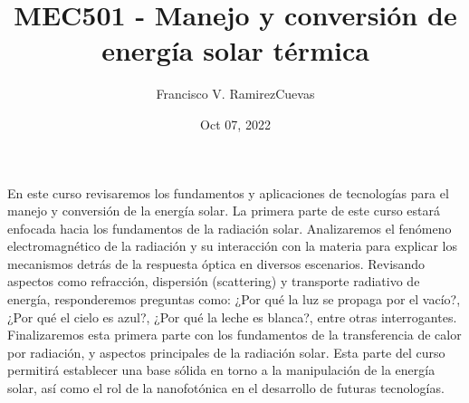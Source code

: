 \documentclass[letterpaper,10pt,english]{jupyterBook}
\title{MEC501 - Manejo y conversión de energía solar térmica}
\date{Oct 07, 2022}
\author{Francisco V.\@{} Ramirez\sphinxhyphen{}Cuevas}
\begin{document}
\pagestyle{empty}
\sphinxmaketitle
\pagestyle{plain}
\sphinxtableofcontents
\pagestyle{normal}
\label{\detokenize{intro::doc}}


\sphinxAtStartPar
En este curso revisaremos los fundamentos y aplicaciones de tecnologías para el manejo y
conversión de la energía solar. La primera parte de este curso estará enfocada hacia los
fundamentos de la radiación solar. Analizaremos el fenómeno electromagnético de la radiación
y su interacción con la materia para explicar los mecanismos detrás de la respuesta óptica
en diversos escenarios. Revisando aspectos como refracción, dispersión (scattering) y
transporte radiativo de energía, responderemos preguntas como: ¿Por qué la luz se propaga
por el vacío?, ¿Por qué el cielo es azul?, ¿Por qué la leche es blanca?, entre otras
interrogantes. Finalizaremos esta primera parte con los fundamentos de la transferencia de
calor por radiación, y aspectos principales de la radiación solar. Esta parte del curso
permitirá establecer una base sólida en torno a la manipulación de la energía solar, así
como el rol de la nanofotónica en el desarrollo de futuras tecnologías.
\end{document}

